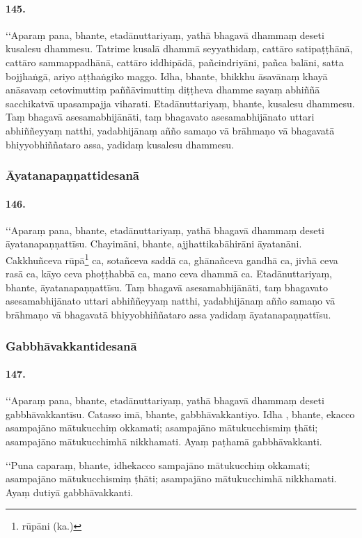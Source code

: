 \paragraph{145.} ‘‘Aparaṃ pana, bhante, etadānuttariyaṃ, yathā bhagavā dhammaṃ deseti kusalesu dhammesu. Tatrime kusalā dhammā seyyathidaṃ, cattāro satipaṭṭhānā, cattāro sammappadhānā, cattāro iddhipādā, pañcindriyāni, pañca balāni, satta bojjhaṅgā, ariyo aṭṭhaṅgiko maggo. Idha, bhante, bhikkhu āsavānaṃ khayā anāsavaṃ cetovimuttiṃ paññāvimuttiṃ diṭṭheva dhamme sayaṃ abhiññā sacchikatvā upasampajja viharati. Etadānuttariyaṃ, bhante, kusalesu dhammesu. Taṃ bhagavā asesamabhijānāti, taṃ bhagavato asesamabhijānato uttari abhiññeyyaṃ natthi, yadabhijānaṃ añño samaṇo vā brāhmaṇo vā bhagavatā bhiyyobhiññataro assa, yadidaṃ kusalesu dhammesu.

\subsubsection{Āyatanapaṇṇattidesanā}

\paragraph{146.} ‘‘Aparaṃ pana, bhante, etadānuttariyaṃ, yathā bhagavā dhammaṃ deseti āyatanapaṇṇattīsu. Chayimāni, bhante, ajjhattikabāhirāni āyatanāni. Cakkhuñceva rūpā\footnote{rūpāni (ka.)} ca, sotañceva saddā ca, ghānañceva gandhā ca, jivhā ceva rasā ca, kāyo ceva phoṭṭhabbā ca, mano ceva dhammā ca. Etadānuttariyaṃ, bhante, āyatanapaṇṇattīsu. Taṃ bhagavā asesamabhijānāti, taṃ bhagavato asesamabhijānato uttari abhiññeyyaṃ natthi, yadabhijānaṃ añño samaṇo vā brāhmaṇo vā bhagavatā bhiyyobhiññataro assa yadidaṃ āyatanapaṇṇattīsu.

\subsubsection{Gabbhāvakkantidesanā}

\paragraph{147.} ‘‘Aparaṃ pana, bhante, etadānuttariyaṃ, yathā bhagavā dhammaṃ deseti gabbhāvakkantīsu. Catasso imā, bhante, gabbhāvakkantiyo. Idha , bhante, ekacco asampajāno mātukucchiṃ okkamati; asampajāno mātukucchismiṃ ṭhāti; asampajāno mātukucchimhā nikkhamati. Ayaṃ paṭhamā gabbhāvakkanti.

‘‘Puna caparaṃ, bhante, idhekacco sampajāno mātukucchiṃ okkamati; asampajāno mātukucchismiṃ ṭhāti; asampajāno mātukucchimhā nikkhamati. Ayaṃ dutiyā gabbhāvakkanti.

